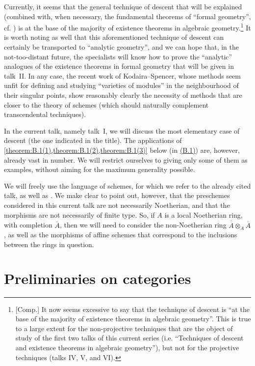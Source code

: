 \documentclass{article}
\theoremstyle{plain}
\theoremstyle{definition}
\newcommand{\oldpage}[1]{\marginpar{\footnotesize$\Big\vert$ \textit{p.~#1}}}
\begin{document}
Currently, it seems that the general technique of descent that will be explained (combined with, when necessary, the fundamental theorems of ``formal geometry'', cf. \cite{3}) is at the base of the majority of existence theorems in algebraic geometry.\footnote{[Comp.] It now seems excessive to say that the technique of descent is ``at the base of the majority of existence theorems in algebraic geometry''. This is true to a large extent for the non-projective techniques that are the object of study of the first two talks of this current series (i.e. ``Techniques of descent and existence theorems in algebraic geometry''), but not for the projective techniques (talks IV, V, and VI).}
It is worth noting as well that this aforementioned technique of descent can certainly be transported to ``analytic geometry'', and we can hope that, in the not-too-distant future, the specialists will know how to prove the ``analytic'' analogues of the existence theorems in formal geometry that will be given in talk~II.
In any case, the recent work of Kodaira--Spencer, whose methods seem unfit for defining and studying ``varieties of modules'' in the neighbourhood of their singular points, show reasonably clearly the necessity of methods that are closer to the theory of schemes (which should naturally complement transcendental techniques).

In the current talk, namely talk~I, we will discuss the most elementary case of descent (the one indicated in the title).
The applications of \cref{theorem:B.1(1),theorem:B.1(2),theorem:B.1(3)} below (in \hyperref[B.1]{(B.1)}) are, however, already vast in number.
We will restrict ourselves to giving only some of them as examples, without aiming for the maximum generality possible.

We will freely use the language of schemes, for which we refer to the already cited talk, as well as \cite{2}.
We make clear to point out, however, that the preschemes considered in this current talk are not necessarily Noetherian, and that the
\oldpage{190-02}
morphisms are not necessarily of finite type.
So, if $A$ is a local Noetherian ring, with completion $\overline{A}$, then we will need to consider the non-Noetherian ring $\overline{\overline{A}}\otimes_A\overline{A}$, as well as the morphisms of affine schemes that correspond to the inclusions between the rings in question.


\part{Preliminaries on categories}
\label{A}
\end{document}
